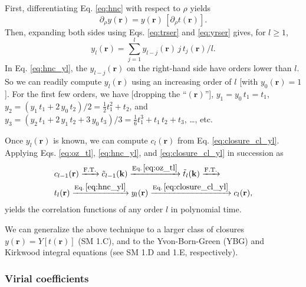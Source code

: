 \documentclass[aip,jcp,preprint,superscriptaddress,showpacs,preprintnumbers,amsmath,amssymb]{revtex4-1}
\newcommand{\vct}[1]{\mathbf{#1}}
\providecommand{\vr}{} %
\renewcommand{\vr}{\vct{r}}
\newcommand{\vk}{\vct{k}}
\begin{document}
First, differentiating Eq. \eqref{eq:hnc} with respect to $\rho$ yields
%
\[
\partial_\rho y(\vr)
=
y(\vr) \, [ \partial_\rho t(\vr) ].
\]
%
Then, expanding both sides
using Eqs. \eqref{eq:trser} and \eqref{eq:yrser}
gives, for $l\ge 1$,
%
\begin{equation}
y_l(\vr)
=
\sum_{j=1}^l
y_{l-j}(\vr) \, j \, t_j(\vr) / l.
\label{eq:hnc_yl}
\end{equation}
%
In Eq. \eqref{eq:hnc_yl},
the $y_{l-j}(\vr)$ on the right-hand side
have orders lower than $l$.
%
So we can readily compute $y_l(\vr)$
using an increasing order of $l$
[with $y_0(\vr) = 1$].
%
For the first few orders,
we have [dropping the ``$(\vr)$''],
%
$y_1 = y_0 \, t_1 = t_1$,
%
$y_2
= (y_1 \, t_1 + 2 \, y_0 \, t_2) / 2
= \frac{1}{2} t_1^2 + t_2$,
and
$y_3
= (y_2 \, t_1 + 2 \, y_1 \, t_2 + 3 \, y_0 \, t_3)/3
= \frac{1}{6} t_1^3 + t_1 \, t_2 + t_3$,
\dots, etc.



Once $y_l(\vr)$ is known,
we can compute $c_l(\vr)$ from Eq. \eqref{eq:closure_cl_yl}.
%
Applying Eqs.
\eqref{eq:oz_tl},
\eqref{eq:hnc_yl}, and
\eqref{eq:closure_cl_yl} in succession as
%
\begin{align*}
&
c_{l-1}(\vr)
\xrightarrow{ \mathrm{F.T.} }
\tilde c_{l-1}(\vk)
\xrightarrow{ \mathrm{Eq.}\,\eqref{eq:oz_tl} }
\tilde t_l(\vk)
\xrightarrow{ \mathrm{F.T.} }
\\
&
t_l(\vr)
\xrightarrow{ \mathrm{Eq.}\,\eqref{eq:hnc_yl} }
y_l(\vr)
\xrightarrow{ \mathrm{Eq.}\,\eqref{eq:closure_cl_yl} }
c_l(\vr),
\end{align*}
yields the correlation functions of any order $l$ in polynomial time.



We can generalize the above technique
to a larger class of closures
$y(\vr) = Y[t(\vr)]$\cite{
hurst1965, rowlinson1965, rowlinson1966,
lado1967, *henderson1970, *zerah1986,
hutchinson1971, hutchinson1972, verlet1980, hall1980,
martynov1983, rogers1984, ballone1986,
marucho2007} (SM 1.C),
and to the Yvon-Born-Green (YBG)\cite{
yvon1935, *born1946, hill, *rice1965, hansen, nijboer1952}
and Kirkwood\cite{
kirkwood1935, *stell1962, hoover1962, hill, *rice1965}
integral equations
(see SM 1.D and 1.E, respectively).





\subsubsection{Virial coefficients}
\end{document}
